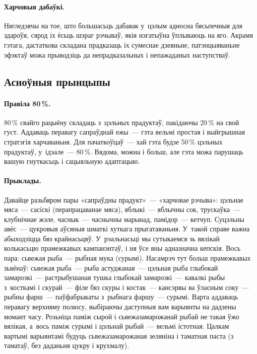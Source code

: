 \paragraph{Харчовыя дабаўкі.}
Нягледзячы на тое, што большасьць дабавак у~цэлым адносна бясьпечныя для здароўя, сярод іх ёсьць шэраг рэчываў, якія нэгатыўна ўплываюць на яго. Акрамя гэтага, дастаткова складана прадказаць іх сумеснае дзеяньне, патэнцыяваньне эфэктаў можа прыводзіць да непрадказальных і непажаданых наступстваў.


\subsection{Асноўныя прынцыпы}

\paragraph{Правіла 80\,\%.}
80\,\% свайго рацыёну складаць з~цэльных прадуктаў, пакідаючы 20\,\% на свой густ. Аддаваць перавагу сапраўднай ежы~--- гэта вельмі простая і выйгрышная стратэгія харчаваньня. Для пачаткоўцаў~--- хай гэта будзе 50\,\% цэльных прадуктаў, у~ідэале~--- 80\,\%. Вядома, можна і больш, але гэта можа парушаць вашую гнуткасьць і сацыяльную адаптацыю.

\paragraph{Прыклады.}
Давайце разьбяром пары «сапраўдны прадукт»~--- «харчовае рэчыва»: цэльнае мяса~--- сасіскі (перапрацаванае мяса), яблыкі~--- яблычны сок, трускаўка~--- клубнічнае жэле, часнык~--- часнычны марынад, памідор~--- кетчуп. Суцэльны авёс~--- цукровыя аўсяныя шматкі хуткага прыгатаваньня. У~такой справе важна абыходзіцца бяз крайнасьцяў. У~рэальнасьці мы сутыкаемся зь вялікай колькасьцю прамежкавых кампанэнтаў, і ня ўсе яны адназначна кепскія. Вось пара: сьвежая рыба~--- рыбная мука (сурымі). Насамрэч тут больш прамежкавых зьвёнаў: сьвежая рыба~--- рыба астуджаная~--- цэльная рыба глыбокай замарозкі~--- растрыбушаная тушка глыбокай замарозкі~--- кавалкі рыбы з~косткамі і скурай~--- філе бяз скуры і костак~--- кансэрвы ва ўласным соку~--- рыбны фарш~--- паўфабрыкаты з~рыбнага фаршу~--- сурымі. Варта аддаваць перавагу верхняму полюсу, выбіраючы даступныя вам варыянты на дадзены момант часу. Розьніца паміж сырой і сьвежазамарожанай рыбай не такая ўжо вялікая, а~вось паміж сурымі і цэльнай рыбай~--- вельмі істотная. Цалкам вартымі варыянтамі будуць сьвежазамарожаная зеляніна і таматная паста (з таматаў, без даданьня цукру і крухмалу).

